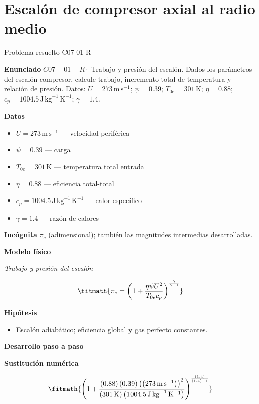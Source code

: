 \documentclass[10pt,openany]{book}
\begin{document}
\chapter{Escalón de compresor axial al radio medio}
\begin{studiumworked}{Problema resuelto C07-01-R}


\noindent\textbf{Enunciado}
\(C07-01-R \cdot\) Trabajo y presión del escalón. Dados los parámetros del escalón compresor, calcule trabajo, incremento total de temperatura y relación de presión. Datos: \(U=273\, \mathrm{m}\,\mathrm{s}^{-1}\); \(\psi=0.39\); \(T_{0e}=301\, \mathrm{K}\); \(\eta=0.88\); \(c_p=1004.5\, \mathrm{J}\,\mathrm{kg}^{-1}\,\mathrm{K}^{-1}\); \(\gamma=1.4\).

\noindent\textbf{Datos}
\begin{itemize}
\item $U = 273\,\mathrm{m}\,\mathrm{s}^{-1}$ — velocidad periférica
\item $\psi = 0.39$ — carga
\item $T_{0e} = 301\,\mathrm{K}$ — temperatura total entrada
\item $\eta = 0.88$ — eficiencia total-total
\item $c_p = 1004.5\,\mathrm{J}\,\mathrm{kg}^{-1}\,\mathrm{K}^{-1}$ — calor específico
\item $\gamma = 1.4$ — razón de calores
\end{itemize}

\noindent\textbf{Incógnita}
$\pi_c$ (adimensional); también las magnitudes intermedias desarrolladas.

\noindent\textbf{Modelo físico}

\noindent\textit{Trabajo y presión del escalón}

\[
\fitmath{\pi_c=\left(1 + \frac{\eta \psi U^{2}}{T_{0e} c_p}\right)^{\frac{\gamma}{\gamma - 1}}}
\]

\noindent\textbf{Hipótesis}
\begin{itemize}
\item Escalón adiabático; eficiencia global y gas perfecto constantes.
\end{itemize}

\noindent\textbf{Desarrollo paso a paso}



\noindent\textbf{Sustitución numérica}

\[
\fitmath{\left(1 + \frac{\left(0.88\right) \left(0.39\right) \left(\left(273\,\mathrm{m}\,\mathrm{s}^{-1}\right)\right)^{2}}{\left(301\,\mathrm{K}\right) \left(1004.5\,\mathrm{J}\,\mathrm{kg}^{-1}\,\mathrm{K}^{-1}\right)}\right)^{\frac{\left(1.4\right)}{\left(1.4\right) - 1}}}
\]


\end{studiumworked}
\end{document}
